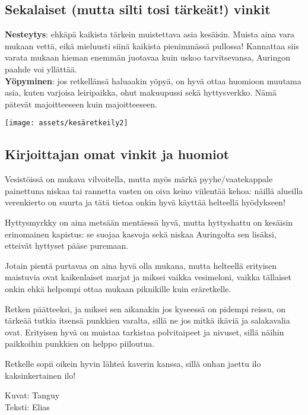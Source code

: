 \begin{multicols}{2}
\subsection*{Sekalaiset (mutta silti tosi tärkeät!) vinkit}

\textbf{Nesteytys}: ehkäpä kaikista tärkein muistettava asia kesäisin. Muista aina vara mukaan vettä, eikä mieluusti siinä kaikista pienimmässä pullossa! Kannattaa siis varata mukaan hieman enemmän juotavaa kuin uskoo tarvitsevansa, Auringon paahde voi yllättää.\\
\textbf{Yöpyminen}: jos retkellänsä haluaakin yöpyä, on hyvä ottaa huomioon muutama asia, kuten varjoisa leiripaikka, ohut makuupussi sekä hyttysverkko. Nämä pätevät majoitteeseen kuin majoitteeseen.

\vspace*{0.32cm}
{\centering\texttt{[image: assets/kesäretkeily2]}}

\subsection*{Kirjoittajan omat vinkit ja huomiot}

Vesistöissä on mukava vilvoitella, mutta myös märkä pyyhe/vaatekappale painettuna niskaa tai rannetta vasten on oiva keino viilentää kehoa: näillä alueilla verenkierto on suurta ja tätä tietoa onkin hyvä käyttää helteellä hyödykseen!

Hyttysmyrkky on aina metsään mentäessä hyvä, mutta hyttyshattu on kesäisin erinomainen kapistus: se suojaa kasvoja sekä niskaa Auringolta sen lisäksi, etteivät hyttyset pääse puremaan.

Jotain pientä purtavaa on aina hyvä olla mukana, mutta helteellä erityisen maistuvia ovat kaikenlaiset marjat ja miksei vaikka vesimeloni, vaikka tällaiset onkin ehkä helpompi ottaa mukaan piknikille kuin eräretkelle.

Retken päätteeksi, ja miksei sen aikanakin jos kyseessä on pidempi reissu, on tärkeää tutkia itsensä punkkien varalta, sillä ne jos mitkä ikäviä ja salakavalia ovat. Erityisen hyvä on muistaa tarkistaa polvitaipeet ja nivuset, sillä näihin paikkoihin punkkien on helppo piiloutua.

Retkelle sopii oikein hyvin lähteä kaverin kanssa, sillä onhan jaettu ilo kaksinkertainen ilo!

\vspace*{0.32cm}
\noindent\null\hfill Kuvat: Tanguy\\
\noindent\null\hfill Teksti: Elias

\end{multicols}

